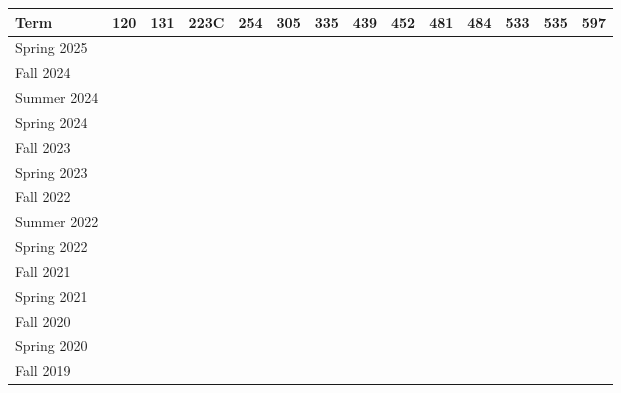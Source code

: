 \documentclass[11pt]{letter}
\newcommand{\ck}{\checkmark}
\begin{document}
  \begin{tabular}{|l|c|c|c|c|c|c|c|c|c|c|c|c|c|}
  \hline
  \textbf{Term} &
  \textbf{120} &
  \textbf{131} &
  \textbf{223C} &
  \textbf{254} &
  \textbf{305} &
  \textbf{335} &
  \textbf{439} &
  \textbf{452} &
  \textbf{481} &
  \textbf{484} &
  \textbf{533} &
  \textbf{535} &
  \textbf{597} \\ \hline

  Spring 2025  &\ck &    &    &    &    &    &    &    &    &    &    &\ck &    \\ \hline
  Fall   2024  &\ck &    &    &    &    &    &    &    &    &    &\ck &    &    \\ \hline
  Summer 2024  &    &    &    &    &    &\ck &    &    &    &    &    &    &    \\ \hline
  Spring 2024  &\ck &    &    &    &    &    &    &    &    &    &    &\ck &    \\ \hline
  Fall   2023  &\ck &    &    &    &    &    &    &    &    &    &    &    &    \\ \hline
  Spring 2023  &\ck &    &    &    &    &    &    &    &    &    &    &\ck &    \\ \hline
  Fall   2022  &\ck &    &    &    &    &      &    &    &    &    &    &   &    \\ \hline
  Summer 2022  &    &    &    &    &    &\ck   &    &    &    &    &    &   &    \\ \hline
  Spring 2022  &    &    &    &    &    &\ck   &    &    &    &    &    &   &    \\ \hline
  Fall   2021  &    &\ck &    &    &    &    &    &    &    &    &\ck &    &    \\ \hline
  Spring 2021  &    &    &    &    &    &\ck &\ck &    &    &    &    &    &    \\ \hline
  Fall   2020  &    &\ck &    &    &    &    &    &    &    &    &\ck &    &    \\ \hline
  Spring 2020  &\ck &    &    &    &    &    &    &    &    &\ck &    &    &    \\ \hline
  Fall   2019 &\ck &    &    &    &    &    &    &    &    &    &\ck &    &    \\ \hline

\end{tabular}
\end{document}
